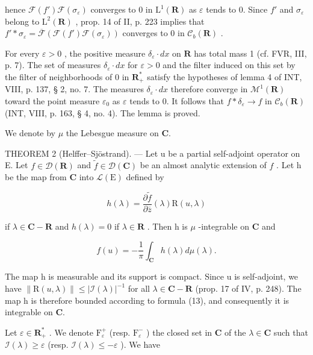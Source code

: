 hence \(\mathcal{F}(f')\mathcal{F}(\sigma_{\varepsilon})\) converges to 0 in \(\mathrm{L}^{1}(\mathbf{R})\) as \(\varepsilon\) tends to 0. Since \(f'\) and \(\sigma_{\varepsilon}\) belong to \(\mathrm{L}^{2}(\mathbf{R})\) , prop. 14 of II, p. 223 implies that \(f'*\sigma_{\varepsilon}=\overline{\mathcal{F}}(\mathcal{F}(f')\mathcal{F}(\sigma_{\varepsilon}))\) converges to 0 in \(\mathcal{C}_{b}(\mathbf{R})\) .

For every \(\varepsilon > 0\) , the positive measure \(\delta_{\varepsilon} \cdot dx\) on \(\mathbf{R}\) has total mass 1 (cf. FVR, III, p. 7). The set of measures \(\delta_{\varepsilon} \cdot dx\) for \(\varepsilon > 0\) and the filter induced on this set by the filter of neighborhoods of 0 in \(\mathbf{R}_{+}^{*}\) satisfy the hypotheses of lemma 4 of INT, VIII, p. 137, § 2, no. 7. The measures \(\delta_{\varepsilon} \cdot dx\) therefore converge in \(\mathcal{M}^{1}(\mathbf{R})\) toward the point measure \(\varepsilon_{0}\) as \(\varepsilon\) tends to 0. It follows that \(f * \delta_{\varepsilon} \to f\) in \(\mathcal{C}_{b}(\mathbf{R})\) (INT, VIII, p. 163, § 4, no. 4). The lemma is proved.

We denote by \(\mu\) the Lebesgue measure on \(\mathbf{C}\).

THEOREM 2 (Helffer--Sjöstrand). --- Let u be a partial self-adjoint operator on E. Let \(f \in \mathcal{D}(\mathbf{R})\) and \(\widetilde{f} \in \mathcal{D}(\mathbf{C})\) be an almost analytic extension of \(f\) . Let h be the map from \(\mathbf{C}\) into \(\mathcal{L}(\mathrm{E})\) defined by

\[
h (\lambda) = \frac {\partial \widetilde {f}}{\partial \overline {{z}}} (\lambda) \mathrm{R} (u, \lambda)
\]

if \(\lambda\in\mathbf{C} - \mathbf{R}\) and \(h(\lambda)=0\) if \(\lambda\in\mathbf{R}\) . Then h is \(\mu\) -integrable on \(\mathbf{C}\) and

\[
f (u) = - \frac {1}{\pi} \int_ {\mathbf {C}} h (\lambda) d \mu (\lambda).
\]

The map h is measurable and its support is compact. Since u is self-adjoint, we have \(\|\mathrm{R}(u,\lambda)\| \leqslant |\mathcal{I}(\lambda)|^{-1}\) for all \(\lambda \in \mathbf{C} - \mathbf{R}\) (prop. 17 of IV, p. 248). The map h is therefore bounded according to formula (13), and consequently it is integrable on \(\mathbf{C}\).

Let \(\varepsilon \in \mathbf{R}_{+}^{*}\) . We denote \(\mathrm{F}_{\varepsilon}^{+}\) (resp. \(\mathrm{F}_{\varepsilon}^{-}\) ) the closed set in \(\mathbf{C}\) of the \(\lambda \in \mathbf{C}\) such that \(\mathcal{I}(\lambda) \geqslant \varepsilon\) (resp. \(\mathcal{I}(\lambda) \leqslant -\varepsilon\) ). We have

